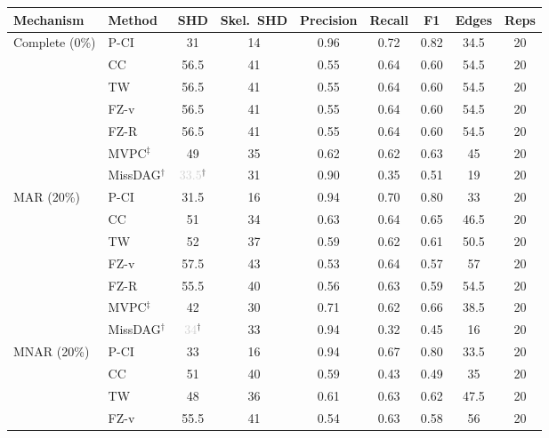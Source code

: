 \begin{tabular}{llccccccc}
    \toprule
    Mechanism & Method & SHD & Skel.\ SHD & Precision & Recall & F1 & Edges & Reps \\
    \midrule
    Complete (0\%)   & P-CI               & 31 & 14 & 0.96 & 0.72 & 0.82 & 34.5 & 20 \\
                     & CC                 & 56.5 & 41 & 0.55 & 0.64 & 0.60 & 54.5 & 20 \\
                     & TW                 & 56.5 & 41 & 0.55 & 0.64 & 0.60 & 54.5 & 20 \\
                     & FZ-v               & 56.5 & 41 & 0.55 & 0.64 & 0.60 & 54.5 & 20 \\
                     & FZ-R               & 56.5 & 41 & 0.55 & 0.64 & 0.60 & 54.5 & 20 \\
                     & MVPC$^\ddagger$    & 49 & 35 & 0.62 & 0.62 & 0.63 & 45 & 20 \\
                     & MissDAG$^\dagger$  & \textcolor{lightgray}{33.5}$^\dagger$ & 31 & 0.90 & 0.35 & 0.51 & 19 & 20 \\
    \midrule
    MAR (20\%)       & P-CI               & 31.5 & 16 & 0.94 & 0.70 & 0.80 & 33 & 20 \\
                     & CC                 & 51 & 34 & 0.63 & 0.64 & 0.65 & 46.5 & 20 \\
                     & TW                 & 52 & 37 & 0.59 & 0.62 & 0.61 & 50.5 & 20 \\
                     & FZ-v               & 57.5 & 43 & 0.53 & 0.64 & 0.57 & 57 & 20 \\
                     & FZ-R               & 55.5 & 40 & 0.56 & 0.63 & 0.59 & 54.5 & 20 \\
                     & MVPC$^\ddagger$    & 42 & 30 & 0.71 & 0.62 & 0.66 & 38.5 & 20 \\
                     & MissDAG$^\dagger$  & \textcolor{lightgray}{34}$^\dagger$ & 33 & 0.94 & 0.32 & 0.45 & 16 & 20 \\
    \midrule
    MNAR (20\%)      & P-CI               & 33 & 16 & 0.94 & 0.67 & 0.80 & 33.5 & 20 \\
                     & CC                 & 51 & 40 & 0.59 & 0.43 & 0.49 & 35 & 20 \\
                     & TW                 & 48 & 36 & 0.61 & 0.63 & 0.62 & 47.5 & 20 \\
                     & FZ-v               & 55.5 & 41 & 0.54 & 0.63 & 0.58 & 56 & 20 \\

\end{tabular}
